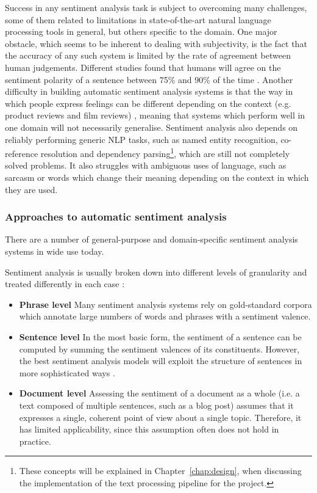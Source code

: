 \documentclass[bsc,frontabs,deptreport,singlespacing,parskip, twoside]{infthesis}
\begin{document}
Success in any sentiment analysis task is subject to overcoming many challenges, some of them related to limitations in state-of-the-art natural language processing tools in general, but others specific to the domain. One major obstacle, which seems to be inherent to dealing with subjectivity, is the fact that the accuracy of any such system is limited by the rate of agreement between human judgements. Different studies found that humans will agree on the sentiment polarity of a sentence between 75\% and 90\% of the time \cite{godbole2007large, wilson2005recognizing}. Another difficulty in building automatic sentiment analysis systems is that the way in which people express feelings can be different depending on the context (e.g. product reviews and film reviews) \cite{varghesesurvey}, meaning that systems which perform well in one domain will not necessarily generalise. Sentiment analysis also depends on reliably performing generic NLP tasks, such as named entity recognition, co-reference resolution and dependency parsing\footnote{These concepts will be explained in Chapter~\ref{chap:design}, when discussing the implementation of the text processing pipeline for the project.}, which are still not completely solved problems. It also struggles with ambiguous uses of language, such as sarcasm or words which change their meaning depending on the context in which they are used.

\subsubsection{Approaches to automatic sentiment analysis}

There are a number of general-purpose and domain-specific sentiment analysis systems in wide use today.

Sentiment analysis is usually broken down into different levels of granularity and treated differently in each case \cite{liu2012sentiment}:
\begin{itemize}
	\item \textbf{Phrase level} Many sentiment analysis systems rely on gold-standard corpora which annotate large numbers of words and phrases with a sentiment valence.
	\item \textbf{Sentence level} In the most basic form, the sentiment of a sentence can be computed by summing the sentiment valences of its constituents. However, the best sentiment analysis models will exploit the structure of sentences in more sophisticated ways \cite{socher2013recursive}.
	\item \textbf{Document level} Assessing the sentiment of a document as a whole (i.e. a text composed of multiple sentences, such as a blog post) assumes that it expresses a single, coherent point of view about a single topic. Therefore, it has limited applicability, since this assumption often does not hold in practice.
\end{itemize}
\end{document}
